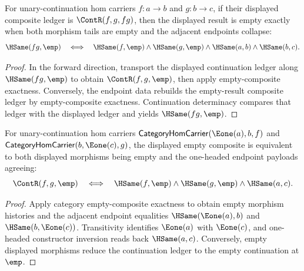 \begin{theorem}
\label{thm:category-hom-carrier-comp-result-empty-iff}
For unary-continuation hom carriers $f:a\to b$ and $g:b\to c$, if their
displayed composite ledger is $\ContR(f,g,fg)$, then the displayed result is
empty exactly when both morphism tails are empty and the adjacent endpoints
collapse:
$$
\HSame(fg,\emp)
\quad\Longleftrightarrow\quad
\HSame(f,\emp)\wedge\HSame(g,\emp)\wedge\HSame(a,b)\wedge\HSame(b,c).
$$
\end{theorem}
\begin{proof}
In the forward direction, transport the displayed continuation ledger along
$\HSame(fg,\emp)$ to obtain $\ContR(f,g,\emp)$, then apply empty-composite
exactness. Conversely, the endpoint data rebuilds the empty-result composite
ledger by empty-composite exactness. Continuation determinacy compares that
ledger with the displayed ledger and yields $\HSame(fg,\emp)$.
\end{proof}

\begin{theorem}
\label{thm:category-hom-carrier-e1-endpoint-empty-composite-iff}
For unary-continuation hom carriers
$\mathsf{CategoryHomCarrier}(\Eone(a),b,f)$ and
$\mathsf{CategoryHomCarrier}(b,\Eone(c),g)$, the displayed empty composite is
equivalent to both displayed morphisms being empty and the one-headed endpoint
payloads agreeing:
$$
\ContR(f,g,\emp)
\quad\Longleftrightarrow\quad
\HSame(f,\emp)\wedge\HSame(g,\emp)\wedge\HSame(a,c).
$$
\end{theorem}
\begin{proof}
Apply category empty-composite exactness to obtain empty morphism histories and
the adjacent endpoint equalities
$\HSame(\Eone(a),b)$ and $\HSame(b,\Eone(c))$. Transitivity identifies
$\Eone(a)$ with $\Eone(c)$, and one-headed constructor inversion reads back
$\HSame(a,c)$. Conversely, empty displayed morphisms reduce the continuation
ledger to the empty continuation at $\emp$.
\end{proof}
